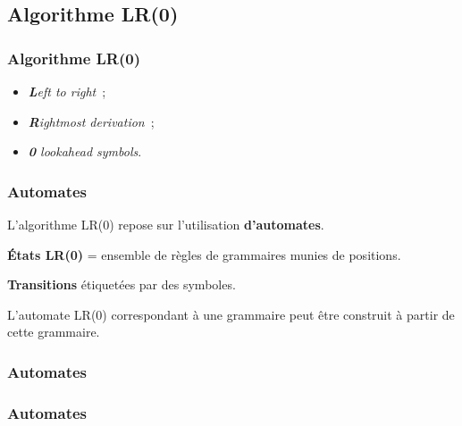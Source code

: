 \subsection{Algorithme LR(0)}

\begin{frame}
    \frametitle{Algorithme LR(0)}

    \begin{itemize}
        \item \textit{\textbf{L}eft to right}~;
        \item \textit{\textbf{R}ightmost derivation}~;
        \item \textit{\textbf{0} lookahead symbols}.
    \end{itemize}
\end{frame}

\begin{frame}
    \frametitle{Automates}

    \pause
    L’algorithme LR(0) repose sur l’utilisation \textbf{d’automates}.

    \pause
    \begin{definition}[automate]
        \textbf{États LR(0)} = ensemble de règles de grammaires munies de
        positions.

        \textbf{Transitions} étiquetées par des symboles.
    \end{definition}

    \pause
    L’automate LR(0) correspondant à une grammaire peut être construit à partir
    de cette grammaire.
\end{frame}

\begin{frame}
    \frametitle{Automates}

\end{frame}

\begin{frame}
    \frametitle{Automates}

    \begin{minipage}{0.3\textwidth}
    
    \end{minipage}%
    \begin{minipage}{0.7\textwidth}
        \begin{center}
        \maxsizebox{\textwidth}{0.8\textheight}{
            
        }
        \end{center}
    \end{minipage}
\end{frame}

